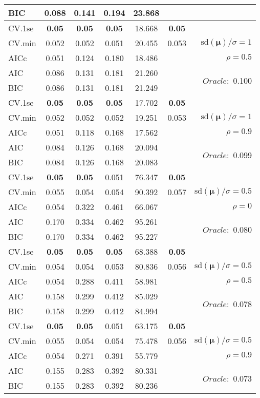 \begin{table}
\begin{center}
\begin{tabular}{l*{5}{c}|r}
BIC & 0.088 & 0.141 & 0.194 & 23.868 & &  \\
 \hline 
CV.1se & {\bf 0.05} & {\bf 0.05} & {\bf 0.05} & 18.668 & {\bf 0.05} & \\
CV.min & 0.052 & 0.052 & 0.051 & 20.455 & 0.053 &  $\mathrm{sd}(\mathbf{\mu})/\sigma=1$ \\
AICc & 0.051 & 0.124 & 0.180 & 18.486 & & $\rho=0.5$ \\
AIC & 0.086 & 0.131 & 0.181 & 21.260 & &  \multirow{2}{*}{$Oracle: $ 0.100} \\
BIC & 0.086 & 0.131 & 0.181 & 21.249 & &  \\
 \hline 
CV.1se & {\bf 0.05} & {\bf 0.05} & {\bf 0.05} & 17.702 & {\bf 0.05} & \\
CV.min & 0.052 & 0.052 & 0.052 & 19.251 & 0.053 &  $\mathrm{sd}(\mathbf{\mu})/\sigma=1$ \\
AICc & 0.051 & 0.118 & 0.168 & 17.562 & & $\rho=0.9$ \\
AIC & 0.084 & 0.126 & 0.168 & 20.094 & &  \multirow{2}{*}{$Oracle: $ 0.099} \\
BIC & 0.084 & 0.126 & 0.168 & 20.083 & &  \\
 \hline 
CV.1se & {\bf 0.05} & {\bf 0.05} & 0.051 & 76.347 & {\bf 0.05} & \\
CV.min & 0.055 & 0.054 & 0.054 & 90.392 & 0.057 &  $\mathrm{sd}(\mathbf{\mu})/\sigma=0.5$ \\
AICc & 0.054 & 0.322 & 0.461 & 66.067 & & $\rho=0$ \\
AIC & 0.170 & 0.334 & 0.462 & 95.261 & &  \multirow{2}{*}{$Oracle: $ 0.080} \\
BIC & 0.170 & 0.334 & 0.462 & 95.227 & &  \\
 \hline 
CV.1se & {\bf 0.05} & {\bf 0.05} & {\bf 0.05} & 68.388 & {\bf 0.05} & \\
CV.min & 0.054 & 0.054 & 0.053 & 80.836 & 0.056 &  $\mathrm{sd}(\mathbf{\mu})/\sigma=0.5$ \\
AICc & 0.054 & 0.288 & 0.411 & 58.981 & & $\rho=0.5$ \\
AIC & 0.158 & 0.299 & 0.412 & 85.029 & &  \multirow{2}{*}{$Oracle: $ 0.078} \\
BIC & 0.158 & 0.299 & 0.412 & 84.994 & &  \\
 \hline 
CV.1se & {\bf 0.05} & {\bf 0.05} & 0.051 & 63.175 & {\bf 0.05} & \\
CV.min & 0.055 & 0.054 & 0.054 & 75.478 & 0.056 &  $\mathrm{sd}(\mathbf{\mu})/\sigma=0.5$ \\
AICc & 0.054 & 0.271 & 0.391 & 55.779 & & $\rho=0.9$ \\
AIC & 0.155 & 0.283 & 0.392 & 80.331 & &  \multirow{2}{*}{$Oracle: $ 0.073} \\
BIC & 0.155 & 0.283 & 0.392 & 80.236 & &  \\
 \hline 
\end{tabular}
\end{center}
\vspace{-1cm}
\end{table}




